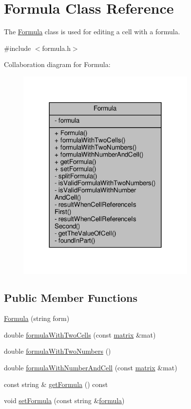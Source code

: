 \hypertarget{class_formula}{}\section{Formula Class Reference}
\label{class_formula}


The \hyperlink{class_formula}{Formula} class is used for editing a cell with a formula.  




{\ttfamily \#include $<$formula.\+h$>$}



Collaboration diagram for Formula\+:
\nopagebreak
\begin{figure}[H]
\begin{center}
\leavevmode
\includegraphics[width=252pt]{class_formula__coll__graph}
\end{center}
\end{figure}
\subsection*{Public Member Functions}
\begin{DoxyCompactItemize}
\item 
\hyperlink{class_formula_aed38ad076eb638148bcbe867d6acea60}{Formula} (string form)
\item 
double \hyperlink{class_formula_a518bc97bd50f1cc5573be7d3f8cb6253}{formula\+With\+Two\+Cells} (const \hyperlink{formula_8h_a869e2a5deeb3daa4c82d6bc91cf20d92}{matrix} \&mat)
\item 
double \hyperlink{class_formula_a2159ffdb34d80f2bee422eee89fc871a}{formula\+With\+Two\+Numbers} ()
\item 
double \hyperlink{class_formula_a0f831b2ee98fbeb7df371f83ee7d374d}{formula\+With\+Number\+And\+Cell} (const \hyperlink{formula_8h_a869e2a5deeb3daa4c82d6bc91cf20d92}{matrix} \&mat)
\item 
const string \& \hyperlink{class_formula_a1b9557287ed502f9523c5c7b1805bac1}{get\+Formula} () const
\item 
void \hyperlink{class_formula_aba7633655dad414ed0a1d92cdba38163}{set\+Formula} (const string \&\hyperlink{class_formula_a2a3b5b998b48db1fadf57752e59ed4fb}{formula})
\end{DoxyCompactItemize}
